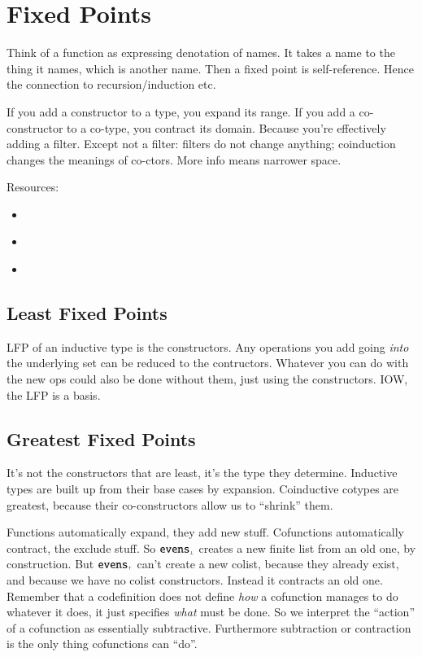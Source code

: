 \section{Fixed Points}\label{sec:fixpoints}

Think of a function as expressing denotation of names. It takes a name
to the thing it names, which is another name. Then a fixed point is
self-reference. Hence the connection to recursion/induction etc.

If you add a constructor to a type, you expand its range. If you add a
co-constructor to a co-type, you contract its domain. Because you're
effectively adding a filter. Except not a filter: filters do not
change anything; coinduction changes the meanings of co-ctors. More
info means narrower space.

Resources:

\begin{itemize}
\item {} \cite{lawvere1997conceptual}
\item {} \cite{davey2002introduction}
\item {} \cite{stoy1977denotational}
\end{itemize}

\subsection{Least Fixed Points}

LFP of an inductive type is the constructors. Any operations you add
going \textit{into} the underlying set can be reduced to the
contructors. Whatever you can do with the new ops could also be done
without them, just using the constructors. IOW, the LFP is a basis.

\subsection{Greatest Fixed Points}

It's not the constructors that are least, it's the type they
determine. Inductive types are built up from their base cases by
expansion. Coinductive cotypes are greatest, because their
co-constructors allow us to ``shrink'' them.

Functions automatically expand, they add new stuff. Cofunctions
automatically contract, the exclude stuff. So \(\texttt{\upshape evens}_{\scriptscriptstyle\bot}\) creates
a new finite list from an old one, by construction. But
\(\texttt{\upshape evens}_{\scriptscriptstyle\top}\) can't create a new colist, because they already
exist, and because we have no colist constructors. Instead it
contracts an old one. Remember that a codefinition does not define
\textit{how} a cofunction manages to do whatever it does, it just
specifies \textit{what} must be done. So we interpret the ``action''
of a cofunction as essentially subtractive. Furthermore subtraction or
contraction is the only thing cofunctions can ``do''.

